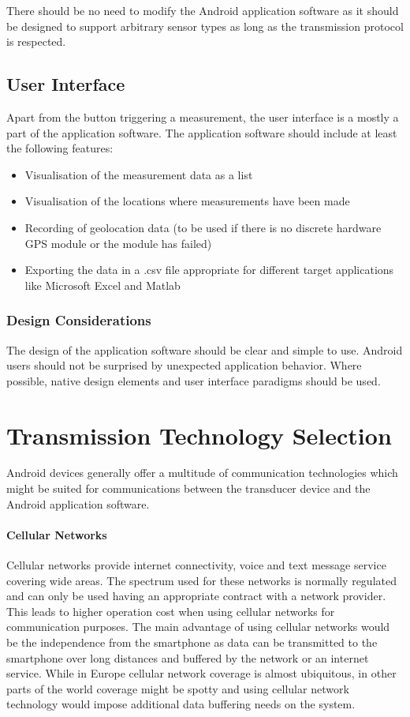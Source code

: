 There should be no need to modify the Android application software as it should be designed to support arbitrary sensor types as long as the transmission protocol is respected.

\subsection{User Interface}
Apart from the button triggering a measurement, the user interface is a mostly a part of the application software. The application software should include at least the following features:

\begin{itemize}
	\item Visualisation of the measurement data as a list
	\item Visualisation of the locations where measurements have been made
	\item Recording of geolocation data (to be used if there is no discrete hardware GPS module or the module has failed)
	\item Exporting the data in a .csv file appropriate for different target applications like Microsoft Excel and Matlab
\end{itemize}

\subsubsection{Design Considerations}
The design of the application software should be clear and simple to use. Android users should not be surprised by unexpected application behavior. Where possible, native design elements and user interface paradigms should be used.

\section{Transmission Technology Selection}
Android devices generally offer a multitude of communication technologies which might be suited for communications between the transducer device and the Android application software.

\paragraph{Cellular Networks}
Cellular networks provide internet connectivity, voice and text message service covering wide areas. The spectrum used for these networks is normally regulated and can only be used having an appropriate contract with a network provider. This leads to higher operation cost when using cellular networks for communication purposes. The main advantage of using cellular networks would be the independence from the smartphone as data can be transmitted to the smartphone over long distances and buffered by the network or an internet service. While in Europe cellular network coverage is almost ubiquitous, in other parts of the world coverage might be spotty and using cellular network technology would impose additional data buffering needs on the system.

